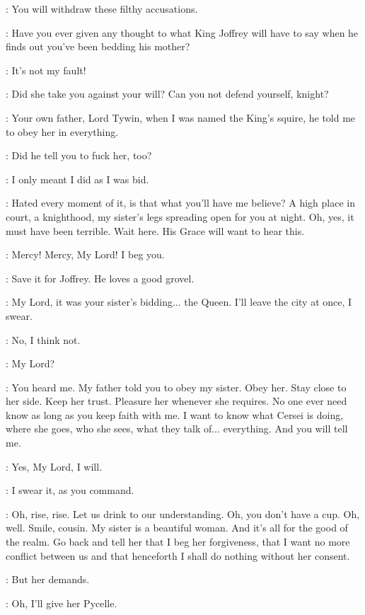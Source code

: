 \LANCEL: You will withdraw these filthy accusations. 

\TYRION: Have you ever given any thought to what King Joffrey will have to say when he finds out you've been bedding his mother? 

\LANCEL: It's not my fault! 

\TYRION: Did she take you against your will? Can you not defend yourself, knight? 

\LANCEL: Your own father, Lord Tywin, when I was named the King's squire, he told me to obey her in everything. 

\TYRION: Did he tell you to fuck her, too? 

\LANCEL: I only meant I did as I was bid. 

\TYRION: Hated every moment of it, is that what you'll have me believe? A high place in court, a knighthood, my sister's legs spreading open for you at night. Oh, yes, it must have been terrible. Wait here. His Grace will want to hear this. 

\LANCEL: Mercy! Mercy, My Lord! I beg you. 


\TYRION: Save it for Joffrey. He loves a good grovel. 

\LANCEL: My Lord, it was your sister's bidding$\ldots$ the Queen. I'll leave the city at once, I swear. 

\TYRION: No, I think not. 

\LANCEL: My Lord? 

\TYRION: You heard me. My father told you to obey my sister. Obey her. Stay close to her side. Keep her trust. Pleasure her whenever she requires. No one ever need know as long as you keep faith with me. I want to know what Cersei is doing, where she goes, who she sees, what they talk of$\ldots$ everything. And you will tell me. 

\TYRION: Yes, My Lord, I will. 

\LANCEL: I swear it, as you command. 

\TYRION: Oh, rise, rise. Let us drink to our understanding. Oh, you don't have a cup. Oh, well. Smile, cousin. My sister is a beautiful woman. And it's all for the good of the realm. Go back and tell her that I beg her forgiveness, that I want no more conflict between us and that henceforth I shall do nothing without her consent. 

\LANCEL: But her demands. 

\TYRION: Oh, I'll give her Pycelle. 

